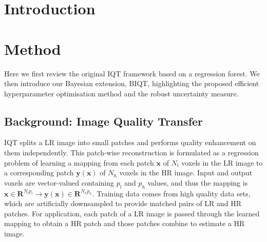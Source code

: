 \section{Introduction}



\section{Method}
Here we first review the original IQT framework based on a regression forest. We then introduce our Bayesian extension, BIQT, highlighting the proposed efficient hyperparameter optimisation method and the robust uncertainty measure. 

\subsection{Background: Image Quality Transfer}
IQT splits a LR image into small patches and performs quality enhancement on them independently. This patch-wise reconstruction is formulated as a regression problem of learning a mapping from each patch $\mathbf{x}$ of $N_l$ voxels in the LR image to a corresponding patch  $\mathbf{y}(\mathbf{x})$ of $N_h$ voxels in the HR image. Input and output voxels are vector-valued containing $p_l$ and $p_h$ values, and thus the mapping is $\mathbf{x}\in\mathbf{R}^{N_lp_l} \rightarrow \mathbf{y}(\mathbf{x})\in\mathbf{R}^{N_hp_h}$. Training data comes from high quality data sets, which are artificially downsampled to provide matched pairs of LR and HR patches. For application, each patch of a LR image is passed through the learned mapping to obtain a HR patch and those patches combine to estimate a HR image. 

